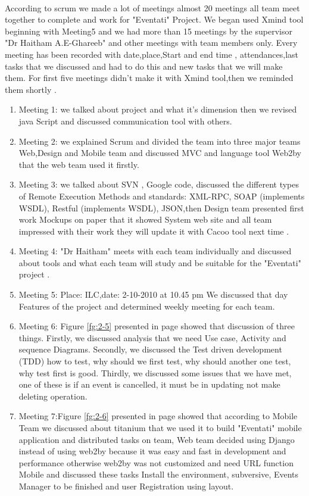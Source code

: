 \documentclass[12pt,a4paper,class,twoside,openany]{report}
\begin{document}
 \paragraph*{\hspace{.9 cm} } According to scrum we made a lot of meetings almost 20 meetings all team meet together to complete and work for "Eventati" Project.
We began used Xmind tool beginning with Meeting5 and we had more than 15 meetings by the supervisor  "Dr Haitham A.E-Ghareeb" and other meetings with team members only.
Every meeting has been recorded with date,place,Start and end time , attendances,last tasks that we discussed and had to do this and new tasks that we will make them.
For first five  meetings didn't make it with Xmind tool,then we reminded them shortly .
\begin{enumerate}
\item Meeting 1: we talked about project and what it's dimension then we revised java Script and discussed communication tool with others.
\item Meeting 2: we explained  Scrum and divided the team into three major teams Web,Design and Mobile team   and discussed MVC and language tool Web2by that the web team used it firstly.
\item Meeting 3: we talked about SVN , Google code, discussed the different types of Remote Execution Methods and standards: XML-RPC, SOAP (implements WSDL), Restful (implements WSDL), JSON,then Design team presented first work Mockups on paper that it showed System web site and all team impressed with their work they will update it with Cacoo tool next time .
\item Meeting 4: "Dr Haitham" meets with each team individually and discussed about tools and what each team will study and be suitable for the "Eventati" project .
\item Meeting 5: Place: ILC,date: 2-10-2010 at 10.45 pm We discussed that day Features of the project and determined weekly meeting for each team.
\item Meeting 6: Figure \ref{fg:2-5} presented in page \pageref{fg:2-5} showed that discussion of three things. Firstly, we discussed analysis that we need Use case, Activity and sequence Diagrams. Secondly, we discussed the Test driven development (TDD) how to test, why should we first test, why should another one test, why test first is good. Thirdly, we discussed some issues that we have met, one of these is if an event is cancelled, it must be in updating not make deleting operation.
\item Meeting 7:Figure \ref{fg:2-6} presented in page \pageref{fg:2-6} showed that according to Mobile Team we discussed about titanium that we used it to build "Eventati" mobile application and distributed tasks on team, Web team decided using Django instead of using web2by because it was easy and fast in development and performance otherwise web2by was not customized and need URL function Mobile and discussed  these tasks Install the environment, subversive, Events Manager to be finished and user Registration using layout.

\end{enumerate}
\end{document}
